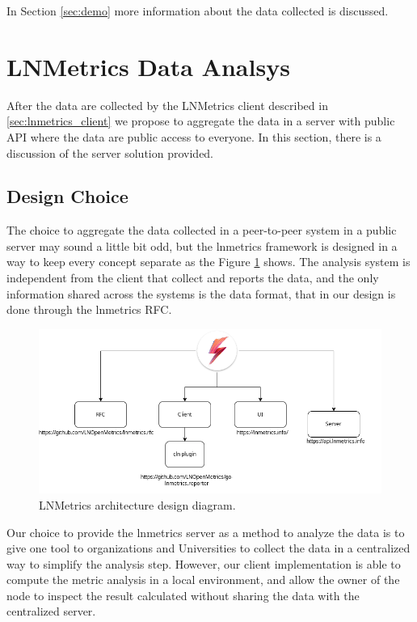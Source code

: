 In Section \ref{sec:demo} more information about the data collected is discussed.

\section{LNMetrics Data Analsys}
\label{sec:lnmetrics_server}

After the data are collected by the LNMetrics client described in \ref{sec:lnmetrics_client}
we propose to aggregate the data in a server with public API where the data are 
public access to everyone. In this section, there is a discussion of 
the server solution provided.

\subsection{Design Choice}

The choice to aggregate the data collected in a peer-to-peer system in a public 
server may sound a little bit odd, but the lnmetrics framework is designed in a 
way to keep every concept separate as the Figure \ref{fig:lnmetrics_architecture} 
shows. The analysis system is independent from the client that collect and reports
the data, and the only information shared across the systems is the data format, 
that in our design is done through the lnmetrics RFC.

\begin{figure}
    \begin{center}
    \includegraphics[scale=0.5]{imgs/lnmetrics-architecture.drawio.png}
    \end{center}
    \caption{LNMetrics architecture design diagram.}
    \label{fig:lnmetrics_architecture}
\end{figure}

Our choice to provide the lnmetrics server as a method to analyze the data is to 
give one tool to organizations and Universities to collect the data in a centralized
way to simplify the analysis step. However, our client implementation is able
to compute the metric analysis in a local environment, and allow the owner
of the node to inspect the result calculated without sharing the data with the centralized
server.

